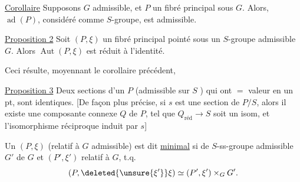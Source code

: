 \uline{Corollaire} Supposons $G$ admissible, et $P$ un fibré principal sous $G$. Alors, $\operatorname{ad}(P)$, considéré comme $S$-groupe, est admissible.

\uline{Proposition 2} Soit $(P,\xi)$ un fibré principal pointé sous un $S$-groupe admissible $G$. Alors $\operatorname{Aut}(P,\xi)$ est réduit à l'identité.

Ceci résulte, moyennant le corollaire précédent, 

 \uline{Proposition 3} Deux sections d'un $P$  (admissible sur $S$ ) qui ont $=$ valeur en un pt, sont identiques. [De façon plus précise, si $s$ est une section de $P/S$, alors il existe une composante connexe  $Q$ de $P$, tel que $Q_{\text{réd}}\to S$ soit un isom, et l'isomorphisme réciproque induit par $s$]

Un $(P,\xi)$  (relatif à $G$ admissible) est dit \uline{minimal} si  de $S$-ss-groupe admissible $G'$ de $G$ et $(P',\xi')$ relatif à $G$, t.q.
\[
(P,\deleted{\unsure{\xi'}}\xi)\simeq(P',\xi')\times_G G'.
\]
